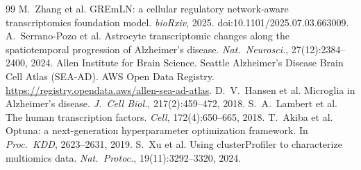 \documentclass[10pt,twocolumn,letterpaper]{article}
\begin{document}
{\begin{thebibliography}{99}
 M.~Zhang et al. GREmLN: a cellular regulatory network-aware transcriptomics foundation model. \emph{bioRxiv}, 2025. doi:10.1101/2025.07.03.663009.
 A.~Serrano-Pozo et al. Astrocyte transcriptomic changes along the spatiotemporal progression of Alzheimer's disease. \emph{Nat.\ Neurosci.}, 27(12):2384--2400, 2024.
 Allen Institute for Brain Science. Seattle Alzheimer's Disease Brain Cell Atlas (SEA-AD). AWS Open Data Registry. \url{https://registry.opendata.aws/allen-sea-ad-atlas}.
 D.~V.~Hansen et al. Microglia in Alzheimer's disease. \emph{J.\ Cell Biol.}, 217(2):459--472, 2018.
 S.~A.~Lambert et al. The human transcription factors. \emph{Cell}, 172(4):650--665, 2018.
 T.~Akiba et al. Optuna: a next-generation hyperparameter optimization framework. In \emph{Proc.\ KDD}, 2623--2631, 2019.
 S.~Xu et al. Using clusterProfiler to characterize multiomics data. \emph{Nat.\ Protoc.}, 19(11):3292--3320, 2024.
\end{thebibliography}}
\end{document}
